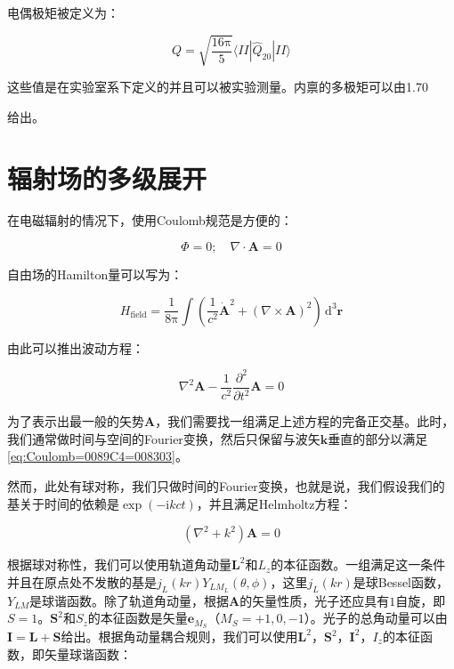 电偶极矩被定义为：

\begin{equation}
Q=\sqrt{\frac{16\mathrm{\pi}}{5}}\langle II|\hat{Q}_{20}|II\rangle
\end{equation}

这些值是在实验室系下定义的并且可以被实验测量。内禀的多极矩可以由1.70

给出。

\section{辐射场的多级展开}

在电磁辐射的情况下，使用Coulomb规范是方便的：

\begin{equation}
\Phi=0;\quad\nabla\cdot\boldsymbol{A}=0\label{eq:Coulomb=0089C4=008303}
\end{equation}

自由场的Hamilton量可以写为：

\begin{equation}
H_{\text{field}}=\frac{1}{8\mathrm{\pi}}\int\left(\frac{1}{c^{2}}\dot{\boldsymbol{A}}^{2}+(\nabla\times\boldsymbol{A})^{2}\right)\,\mathrm{d}^{3}\boldsymbol{r}
\end{equation}

由此可以推出波动方程：

\begin{equation}
\nabla^{2}\boldsymbol{A}-\frac{1}{c^{2}}\frac{\partial^{2}}{\partial t^{2}}\boldsymbol{A}=0
\end{equation}

为了表示出最一般的矢势$\boldsymbol{A}$，我们需要找一组满足上述方程的完备正交基。此时，我们通常做时间与空间的Fourier变换，然后只保留与波矢$\boldsymbol{k}$垂直的部分以满足\ref{eq:Coulomb=0089C4=008303}。

然而，此处有球对称，我们只做时间的Fourier变换，也就是说，我们假设我们的基关于时间的依赖是$\exp(-\mathrm{i}kct)$，并且满足Helmholtz方程：

\begin{equation}
(\nabla^{2}+k^{2})\boldsymbol{A}=0
\end{equation}

根据球对称性，我们可以使用轨道角动量$\boldsymbol{L}^{2}$和$L_{z}$的本征函数。一组满足这一条件并且在原点处不发散的基是$j_{L}(kr)Y_{LM_{L}}(\theta,\phi)$，这里$j_{L}(kr)$是球Bessel函数，$Y_{LM}$是球谐函数。除了轨道角动量，根据$\boldsymbol{A}$的矢量性质，光子还应具有$1$自旋，即$S=1$。$\boldsymbol{S}^{2}$和$S_{z}$的本征函数是矢量$\boldsymbol{e}_{M_{S}}$（$M_{S}=+1,0,-1$）。光子的总角动量可以由$\boldsymbol{I}=\boldsymbol{L}+\boldsymbol{S}$给出。根据角动量耦合规则，我们可以使用$\boldsymbol{L}^{2}$，$\boldsymbol{S}^{2}$，$\boldsymbol{I}^{2}$，$I_{z}$的本征函数，即矢量球谐函数：

